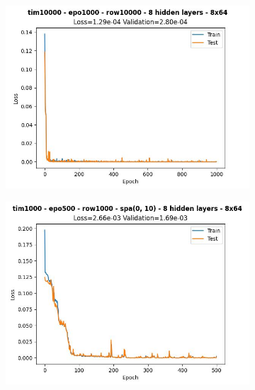 \begin{figure}[H]
\begin{subfigure}{.47\linewidth}
        \includegraphics[width=\textwidth]{other-models/2024-05-20T21:35:42.197356_pendulum_tim10000_epo1000_row10000.jpg}
    \end{subfigure}
    \begin{subfigure}{.47\linewidth}
        \centering
        \includegraphics[width=\textwidth]{other-models/2024-05-20T23:37:01.976786_pendulum_tim1000_epo500_row1000_spa(0, 10).jpg}
    \end{subfigure}
\end{figure}
